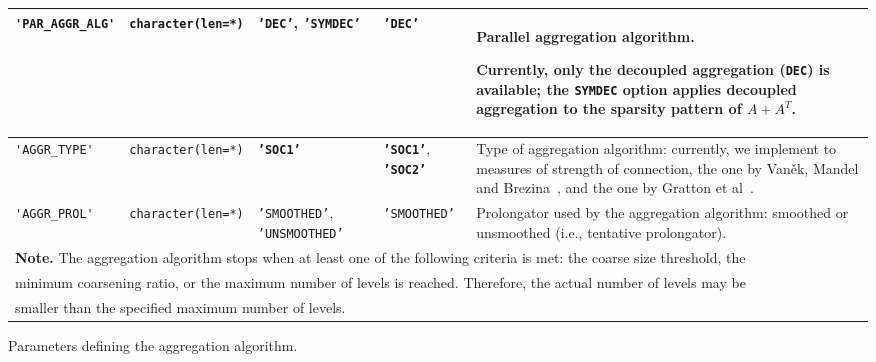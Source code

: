 \begin{center}
\begin{tabular}{|p{3.9cm}|l|p{2.3cm}|p{2.9cm}|p{6.9cm}|}
\verb|'PAR_AGGR_ALG'|  & \verb|character(len=*)| \hspace*{-3mm}
                         & \texttt{'DEC'}, \texttt{'SYMDEC'}
                         & \texttt{'DEC'}
                         & Parallel aggregation algorithm. \par Currently, only the
                         decoupled aggregation (\verb|DEC|) is available; the
                           \verb|SYMDEC| option  applies decoupled
                           aggregation to  the sparsity pattern
                           of $A+A^T$.\\ \hline
\verb|'AGGR_TYPE'|  & \verb|character(len=*)| \hspace*{-3mm}
                         & \textbf{\texttt{'SOC1'}} &
                                                      \textbf{\texttt{'SOC1'}},
                                                      \textbf{\texttt{'SOC2'}}   
                         & Type of aggregation algorithm: currently,
                           we implement to measures of strength of
                           connection, the one by Van\v{e}k, Mandel
                           and Brezina~\cite{VANEK_MANDEL_BREZINA},
                           and the one by Gratton et al~\cite{GrHeJi:16}. \\ \hline
\verb|'AGGR_PROL'|  & \verb|character(len=*)| \hspace*{-3mm}
                         & \texttt{'SMOOTHED'}, \texttt{'UNSMOOTHED'} & \texttt{'SMOOTHED'}
                         & Prolongator used by the aggregation algorithm: smoothed or unsmoothed
                         (i.e., tentative prolongator). \\
\hline
\multicolumn{5}{|l|}{{\bfseries Note.} The aggregation algorithm stops when
at least one of the following criteria is met: 
the coarse size threshold, the} \\
\multicolumn{5}{|l|}{minimum coarsening ratio, or the maximum number
of levels is reached. Therefore, the actual number of levels may be} \\
\multicolumn{5}{|l|}{smaller than the specified maximum number
of levels. } \\
\hline
\end{tabular}
\end{center}
\caption{Parameters defining the aggregation algorithm.
\label{tab:p_aggregation}} 
\esideways

